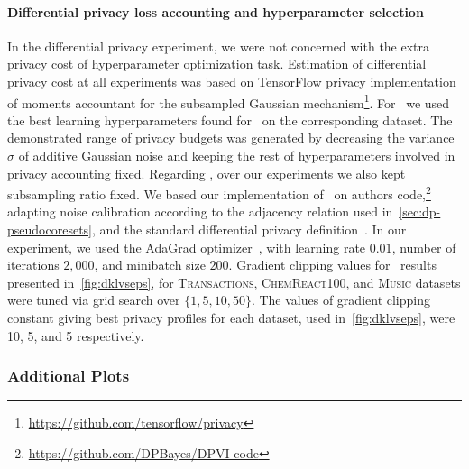 \paragraph{Differential privacy loss accounting and hyperparameter selection}  In the differential privacy experiment, we were not concerned with the extra privacy cost of hyperparameter optimization task.  Estimation of differential privacy cost at all experiments was based on TensorFlow privacy implementation of moments accountant for the subsampled Gaussian mechanism\footnote{\href{https://github.com/tensorflow/privacy}{https://github.com/tensorflow/privacy}}. 
For \dpsvi~we used the best learning hyperparameters found for \psvi~on the corresponding dataset. The demonstrated range of privacy budgets was generated by decreasing the variance $ \sigma $ of additive Gaussian noise and keeping the rest of hyperparameters involved in privacy accounting fixed.  
Regarding \dpvi, over our experiments we also kept subsampling ratio fixed. We based our implementation of \dpvi~on authors code,\footnote{\href{https://github.com/DPBayes/DPVI-code}{https://github.com/DPBayes/DPVI-code}} adapting noise calibration according to the adjacency relation used in~\cref{sec:dp-pseudocoresets}, and the standard differential privacy definition~\citep{dwork14}. In our experiment, we used the AdaGrad optimizer~\citep{duchi11}, with learning rate $0.01$, number of iterations $2,000$, and minibatch size $200$. Gradient clipping values for \dpvi~results presented in~\cref{fig:dklvseps}, for \textsc{Transactions}, \textsc{ChemReact100}, and \textsc{Music} datasets were tuned via grid search over ${\{1, 5, 10, 50\}}$. The values of gradient clipping constant giving best privacy profiles for each dataset, used in~\cref{fig:dklvseps}, were 10, 5, and 5 respectively. 



\subsubsection{Additional Plots}
\label{supp:cpu_timings}



